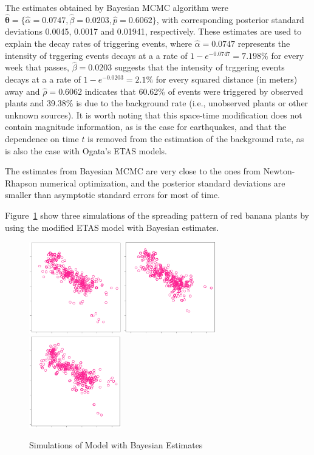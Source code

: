 \documentclass[11pt]{article}\usepackage[]{graphicx}\usepackage[]{color}
\newcommand{\bfig}{\begin{figure}}
\newcommand{\efig}{\end{figure}}
\begin{document}
{The estimates obtained by Bayesian MCMC algorithm were $\boldsymbol{\hat\theta} = \{\hat\alpha = 0.0747, \hat\beta = 0.0203, \hat p = 0.6062\}$, with corresponding posterior standard deviations 0.0045, 0.0017 and 0.01941, respectively. These estimates are used to explain the decay rates of triggering events, where $\hat\alpha = 0.0747$ represents the intensity of trggering events decays at a a rate of $1-e^{-0.0747}=7.198\%$ for every week that passes, $\hat\beta = 0.0203$ suggests that the intensity of trggering events decays at a a rate of $1-e^{-0.0203}=2.1\%$ for every squared distance (in meters) away and $\hat\rho = 0.6062$ indicates that 60.62\% of events were triggered by observed plants and 39.38\% is due to the background rate (i.e., unobserved plants or other unknown sources). It is worth noting that this space-time modification does not contain magnitude information, as is the case for earthquakes, and that the dependence on time $t$ is removed from the estimation of the background rate, as is also the case with Ogata's ETAS models.

The estimates from Bayesian MCMC are very close to the ones from Newton-Rhapson numerical optimization, and the posterior standard deviations are smaller than asymptotic standard errors for most of time.

Figure~\ref{Sims1} show three simulations of the spreading pattern of red banana plants by using the modified ETAS model with Bayesian estimates.

\bfig\centering
\includegraphics[width=4cm]{figures/simulation1.png}
\includegraphics[width=4cm]{figures/simulation2.png}
\includegraphics[width=4cm]{figures/simulation3.png}
\caption{Simulations of Model with Bayesian Estimates}
\label{Sims1}
\efig

}
\end{document}
